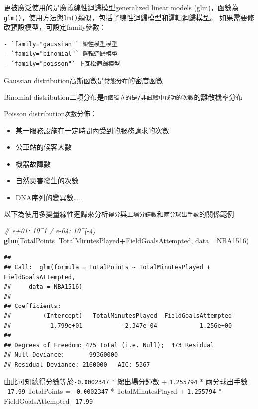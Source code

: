 \documentclass[]{book}
\newenvironment{Shaded}{\begin{snugshade}}{\end{snugshade}}
\newcommand{\CommentTok}[1]{\textcolor[rgb]{0.56,0.35,0.01}{\textit{#1}}}
\newcommand{\DataTypeTok}[1]{\textcolor[rgb]{0.13,0.29,0.53}{#1}}
\newcommand{\KeywordTok}[1]{\textcolor[rgb]{0.13,0.29,0.53}{\textbf{#1}}}
\newcommand{\NormalTok}[1]{#1}
\newcommand{\OperatorTok}[1]{\textcolor[rgb]{0.81,0.36,0.00}{\textbf{#1}}}
\providecommand{\tightlist}{%
  \setlength{\itemsep}{0pt}\setlength{\parskip}{0pt}}
\begin{document}
更被廣泛使用的是廣義線性迴歸模型generalized linear models (glm)，函數為\texttt{glm()}，使用方法與\texttt{lm()}類似，包括了線性迴歸模型和邏輯迴歸模型。
如果需要修改預設模型，可設定family參數：

\begin{verbatim}
- `family="gaussian"` 線性模型模型
- `family="binomial"` 邏輯迴歸模型
- `family="poisson"` 卜瓦松迴歸模型
\end{verbatim}

Gaussian distribution高斯函數是\texttt{常態分布}的密度函數

Binomial distribution二項分布是\texttt{n個獨立的是/非試驗中成功的次數}的離散機率分布

Poisson distribution\texttt{次數}分佈：

\begin{itemize}
\tightlist
\item
  某一服務設施在一定時間內受到的服務請求的次數
\item
  公車站的候客人數
\item
  機器故障數
\item
  自然災害發生的次數
\item
  DNA序列的變異數\ldots..
\end{itemize}

以下為使用多變量線性迴歸來分析\texttt{得分}與\texttt{上場分鐘數}和\texttt{兩分球出手數}的關係範例

\begin{Shaded}
\begin{Highlighting}[]
\CommentTok{# e+01: 10^1 / e-04: 10^(-4)}
\KeywordTok{glm}\NormalTok{(TotalPoints}\OperatorTok{~}\NormalTok{TotalMinutesPlayed}\OperatorTok{+}\NormalTok{FieldGoalsAttempted,}
    \DataTypeTok{data =}\NormalTok{NBA1516)}
\end{Highlighting}
\end{Shaded}

\begin{verbatim}
## 
## Call:  glm(formula = TotalPoints ~ TotalMinutesPlayed + FieldGoalsAttempted, 
##     data = NBA1516)
## 
## Coefficients:
##         (Intercept)   TotalMinutesPlayed  FieldGoalsAttempted  
##          -1.799e+01           -2.347e-04            1.256e+00  
## 
## Degrees of Freedom: 475 Total (i.e. Null);  473 Residual
## Null Deviance:       99360000 
## Residual Deviance: 2160000   AIC: 5367
\end{verbatim}

由此可知總得分數等於\texttt{-0.0002347} * 總出場分鐘數 + \texttt{1.255794} * 兩分球出手數 \texttt{-17.99}
TotalPoints = \texttt{-0.0002347} * TotalMinutesPlayed + \texttt{1.255794} * FieldGoalsAttempted \texttt{-17.99}
\end{document}
